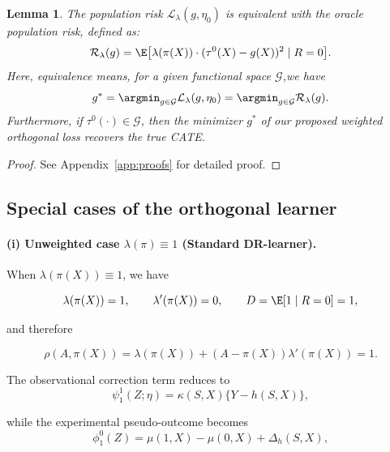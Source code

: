 \documentclass{article} %
\theoremstyle{plain} %
\newtheorem{lemma}[theorem]{Lemma} %
\theoremstyle{definition} %
\theoremstyle{remark} %
\begin{document}
\begin{lemma}
\label{lemma:equiv-orthogonal-loss}
    The population risk $\mathcal{L}_\lambda(g, \eta_0)$ is equivalent with the oracle population risk, defined as:
    \begin{equation}
    \label{eq:oracle-weighted-loss}
        \mathcal{R}_\lambda(g) = \E\bigl[\lambda(\pi(X))\cdot(\tau^0(X)-g(X))^2 \mid R=0\bigr].
    \end{equation}
    Here, equivalence means, for a given functional space $\mathcal{G}$,we have
    \begin{equation}
        g^* = \argmin_{g\in \mathcal{G}} \mathcal{L}_\lambda(g, \eta_0) = \argmin_{g\in \mathcal{G}} \mathcal{R}_\lambda(g).
    \end{equation}
    Furthermore, if $\tau^0(\cdot) \in \mathcal{G}$, then the minimizer $g^*$ of our proposed weighted orthogonal loss recovers the true CATE. 
\end{lemma}
\begin{proof}
    See Appendix~\ref{app:proofs} for detailed proof.
\end{proof}
%
%
%
\subsection{Special cases of the orthogonal learner}
\paragraph{(i) Unweighted case $\lambda(\pi)\equiv 1$ (Standard DR-learner).}
When $\lambda(\pi(X))\equiv 1$, we have

\begin{equation}
    \lambda(\pi(X)) = 1,\qquad
    \lambda'(\pi(X)) = 0,\qquad
    D = \E[1\mid R=0] = 1,
\end{equation}

and therefore

\begin{equation}
    \rho(A,\pi(X))
    = \lambda(\pi(X)) + (A-\pi(X))\lambda'(\pi(X))
    = 1.
\end{equation}

The observational correction term reduces to
\begin{equation}
    \psi^1_1(Z;\eta) = \kappa(S,X)\{Y-h(S,X)\},
\end{equation}

while the experimental pseudo-outcome becomes
\begin{equation}
    \phi^0_1(Z)
    = \mu(1,X)-\mu(0,X) + \Delta_h(S,X),
\end{equation}
\end{document}
